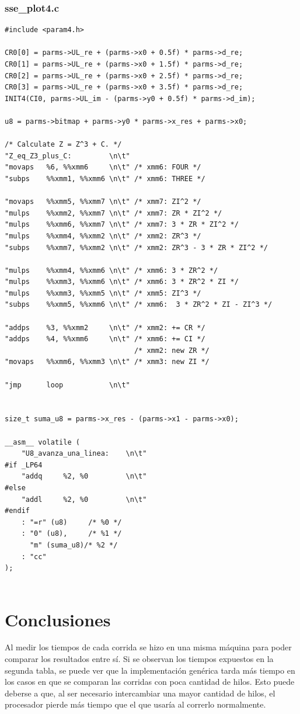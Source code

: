 \documentclass[a4paper,10pt]{article}
\begin{document}
\subsubsection{sse\_plot4.c}
\begin{verbatim}
#include <param4.h>

CR0[0] = parms->UL_re + (parms->x0 + 0.5f) * parms->d_re;
CR0[1] = parms->UL_re + (parms->x0 + 1.5f) * parms->d_re;
CR0[2] = parms->UL_re + (parms->x0 + 2.5f) * parms->d_re;
CR0[3] = parms->UL_re + (parms->x0 + 3.5f) * parms->d_re;
INIT4(CI0, parms->UL_im - (parms->y0 + 0.5f) * parms->d_im);

u8 = parms->bitmap + parms->y0 * parms->x_res + parms->x0;

/* Calculate Z = Z^3 + C. */
"Z_eq_Z3_plus_C:         \n\t"
"movaps   %6, %%xmm6     \n\t" /* xmm6: FOUR */
"subps    %%xmm1, %%xmm6 \n\t" /* xmm6: THREE */

"movaps   %%xmm5, %%xmm7 \n\t" /* xmm7: ZI^2 */
"mulps    %%xmm2, %%xmm7 \n\t" /* xmm7: ZR * ZI^2 */
"mulps    %%xmm6, %%xmm7 \n\t" /* xmm7: 3 * ZR * ZI^2 */
"mulps    %%xmm4, %%xmm2 \n\t" /* xmm2: ZR^3 */
"subps    %%xmm7, %%xmm2 \n\t" /* xmm2: ZR^3 - 3 * ZR * ZI^2 */

"mulps    %%xmm4, %%xmm6 \n\t" /* xmm6: 3 * ZR^2 */
"mulps    %%xmm3, %%xmm6 \n\t" /* xmm6: 3 * ZR^2 * ZI */
"mulps    %%xmm3, %%xmm5 \n\t" /* xmm5: ZI^3 */
"subps    %%xmm5, %%xmm6 \n\t" /* xmm6:  3 * ZR^2 * ZI - ZI^3 */

"addps    %3, %%xmm2     \n\t" /* xmm2: += CR */
"addps    %4, %%xmm6     \n\t" /* xmm6: += CI */
							   /* xmm2: new ZR */
"movaps   %%xmm6, %%xmm3 \n\t" /* xmm3: new ZI */

"jmp      loop           \n\t"


size_t suma_u8 = parms->x_res - (parms->x1 - parms->x0);
		
__asm__ volatile (
	"U8_avanza_una_linea:    \n\t"
#if _LP64
	"addq     %2, %0         \n\t"
#else
	"addl     %2, %0         \n\t"
#endif		
	: "=r" (u8)		/* %0 */
	: "0" (u8),		/* %1 */
	  "m" (suma_u8)/* %2 */
	: "cc"
);


\end{verbatim}




\section{Conclusiones}

Al medir los tiempos de cada corrida se hizo en una misma máquina para poder comparar los resultados entre sí. Si se observan los tiempos expuestos en la segunda tabla, se puede ver que la implementación genérica tarda más tiempo en los casos en que se comparan las corridas con poca cantidad de hilos. Esto puede deberse a que, al ser necesario intercambiar una mayor cantidad de hilos, el procesador pierde más tiempo que el que usaría al correrlo normalmente.
\end{document}
